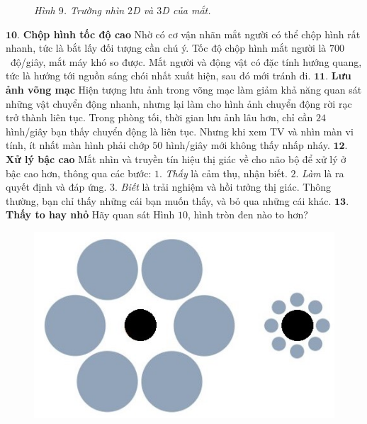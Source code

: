 \begin{multicols}{2}
\begin{figure}[H]
		\caption{\small\textit{\color{timhieukhoahoc}Hình $9$. Trường nhìn $2$D và $3$D của mắt.}}
		\vspace*{-10pt}
	\end{figure}
	$\pmb{10.}$ \textbf{\color{timhieukhoahoc}Chộp hình tốc độ cao}
	\vskip 0.1cm 
	Nhờ có cơ vận nhãn mắt người có thể chộp hình rất nhanh, tức là bắt lấy đối tượng cần chú ý. Tốc độ chộp hình mắt người là $700$~độ/giây, mắt máy khó so được. 
	\vskip 0.1cm
	Mắt người và động vật có đặc tính hướng quang, tức là hướng tới nguồn sáng chói nhất xuất hiện, sau đó mới tránh đi.  
	\vskip 0.1cm
	$\pmb{11.}$ \textbf{\color{timhieukhoahoc}Lưu ảnh võng mạc}
	\vskip 0.1cm
	Hiện tượng lưu ảnh trong võng mạc làm giảm khả năng quan sát những vật chuyển động nhanh, nhưng lại làm cho hình ảnh chuyển động rời rạc trở thành liên tục. Trong phòng tối, thời gian lưu ảnh lâu hơn, chỉ cần $24$ hình/giây bạn thấy chuyển động là liên tục. Nhưng khi xem TV và nhìn màn vi tính, ít nhất màn hình phải chớp $50$ hình/giây mới không thấy nhấp nháy.  
	\vskip 0.1cm
	$\pmb{12.}$ \textbf{\color{timhieukhoahoc}Xử lý bậc cao}
	\vskip 0.1cm
	Mắt nhìn và truyền tín hiệu thị giác về cho não bộ để xử lý ở bậc cao hơn, thông qua các bước:
	\vskip 0.1cm
	$1$. \textit{Thấy} là cảm thụ, nhận biết.
	\vskip 0.1cm
	$2$. \textit{Làm} là ra quyết định và đáp ứng. 
	\vskip 0.1cm
	$3$. \textit{Biết} là trải nghiệm và hồi tưởng thị giác.
	\vskip 0.1cm
	Thông thường, bạn chỉ thấy những cái bạn muốn thấy, và bỏ qua những cái khác.  
	\vskip 0.1cm
	$\pmb{13.}$ \textbf{\color{timhieukhoahoc}Thấy to hay nhỏ}
	\vskip 0.1cm Hãy quan sát Hình $10$, hình tròn đen nào to hơn? 
	\begin{figure}[H]
		\vspace*{-5pt}
		\centering
		\captionsetup{labelformat= empty, justification=centering}
		\includegraphics[width= 1\linewidth]{10}

\end{figure}
\end{multicols}
